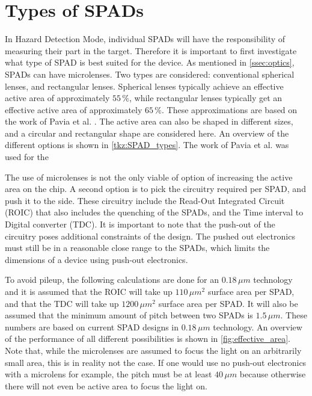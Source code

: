 \section{Types of SPADs}\label{ssec:SPADs}
In Hazard Detection Mode, individual SPADs will have the responsibility of measuring their part in the target. Therefore it is important to first investigate what type of SPAD is best suited for the device. As mentioned in \cref{ssec:optics}, SPADs can have microlenses. Two types are considered: conventional spherical lenses, and rectangular lenses. Spherical lenses typically achieve an effective active area of approximately $55\,\%$, while rectangular lenses typically get an effective active area of approximately $65\,\%$. These approximations are based on the work of Pavia et al. \cite{pavia2014measurement}. The active area can also be shaped in different sizes, and a circular and rectangular shape are considered here. An overview of the different options is shown in \cref{tkz:SPAD_types}. The work of Pavia et al. was used for the 





The use of microlenses is not the only viable of option of increasing the active area on the chip. A second option is to pick the circuitry required per SPAD, and push it to the side. These circuitry include the Read-Out Integrated Circuit (ROIC) that also includes the quenching of the SPADs, and the Time interval to Digital converter (TDC). It is important to note that the push-out of the circuitry poses additional constraints of the design. The pushed out electronics must still be in a reasonable close range to the SPADs, which limits the dimensions of a device using push-out electronics.

To avoid pileup, the following calculations are done for an $0.18\,\mu m$ technology and it is assumed that the ROIC will take up $110\,\mu m^2$ surface area per SPAD, and that the TDC will take up $1200\,\mu m^2$ surface area per SPAD. It will also be assumed that the minimum amount of pitch between two SPADs is $1.5\,\mu m$. These numbers are based on current SPAD designs in $0.18\,\mu m$ technology. An overview of the performance of all different possibilities is shown in \cref{fig:effective_area}. Note that, while the microlenses are assumed to focus the light on an arbitrarily small area, this is in reality not the case. If one would use no push-out electronics with a microlens for example, the pitch must be at least $40\,\mu m$ because otherwise there will not even be active area to focus the light on.

